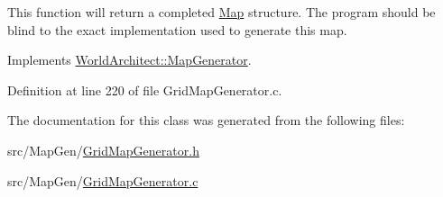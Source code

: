 This function will return a completed \mbox{\hyperlink{class_world_architect_1_1_map}{Map}} structure. The program should be blind to the exact implementation used to generate this map. 

Implements \mbox{\hyperlink{class_world_architect_1_1_map_generator_a0b9c37985de91e45501f69785a9dde8f}{World\+Architect\+::\+Map\+Generator}}.



Definition at line 220 of file Grid\+Map\+Generator.\+c.



The documentation for this class was generated from the following files\+:\begin{DoxyCompactItemize}
\item 
src/\+Map\+Gen/\mbox{\hyperlink{_grid_map_generator_8h}{Grid\+Map\+Generator.\+h}}\item 
src/\+Map\+Gen/\mbox{\hyperlink{_grid_map_generator_8c}{Grid\+Map\+Generator.\+c}}\end{DoxyCompactItemize}

